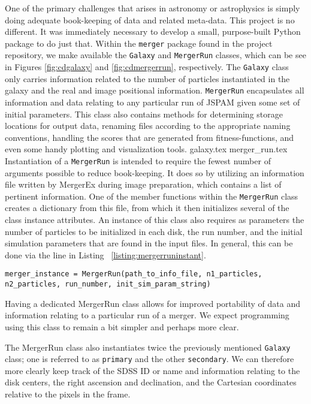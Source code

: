 One of the primary challenges that arises in astronomy or astrophysics is
simply doing adequate book-keeping of data and related meta-data.
This project is no different.
It was immediately necessary to develop a small,
purpose-built Python package to do just that. Within the \texttt{merger} package
found in the project repository, we make available the \texttt{Galaxy} and
\texttt{MergerRun} classes, which can be see in Figures \ref{fig:cdgalaxy} and
\ref{fig:cdmergerrun}, respectively.
The \texttt{Galaxy} class only carries information related to the number of
particles instantiated in the galaxy and the real and image positional
information. \texttt{MergerRun} encapsulates all information and data relating
to any particular run of JSPAM given some set of initial parameters. This class
also contains methods for determining storage locations for output data,
renaming files according to the appropriate naming conventions, handling the
scores that are generated from fitness-functions, and even some handy plotting
and visualization tools.
%
{galaxy.tex}
{merger_run.tex}
%
Instantiation of a \texttt{MergerRun} is intended to require the fewest number
of arguments possible to reduce book-keeping. It does so by utilizing an
information file written by MergerEx during image preparation, which contains
a list of pertinent information. One of the member functions within the
\texttt{MergerRun} class creates a dictionary from this file, from which it then
initializes several of the class instance attributes. An instance of this
class also requires as parameters the number of particles to be initialized
in each disk, the run number, and the initial simulation parameters that are
found in the input files. In general, this can be done via the line in Listing
~\ref{listing:mergerruninstant}.
%
\begin{lstlisting}[caption={Instantiating \texttt{MergerRun}}, label={listing:mergerruninstant}]
merger_instance = MergerRun(path_to_info_file, n1_particles, n2_particles, run_number, init_sim_param_string)
\end{lstlisting}
%
Having a dedicated MergerRun class allows for improved portability of
data and information relating to a particular run of a merger.
We expect
programming using this class to remain a bit simpler and perhaps more clear.

The MergerRun class also instantiates twice the previously mentioned
\texttt{Galaxy} class;
one is referred to as \texttt{primary} and the other \texttt{secondary}.
We can therefore more clearly keep track of the SDSS ID or
name and information relating to the disk centers,
the right ascension and declination, and
the Cartesian coordinates relative to the pixels in the frame.

